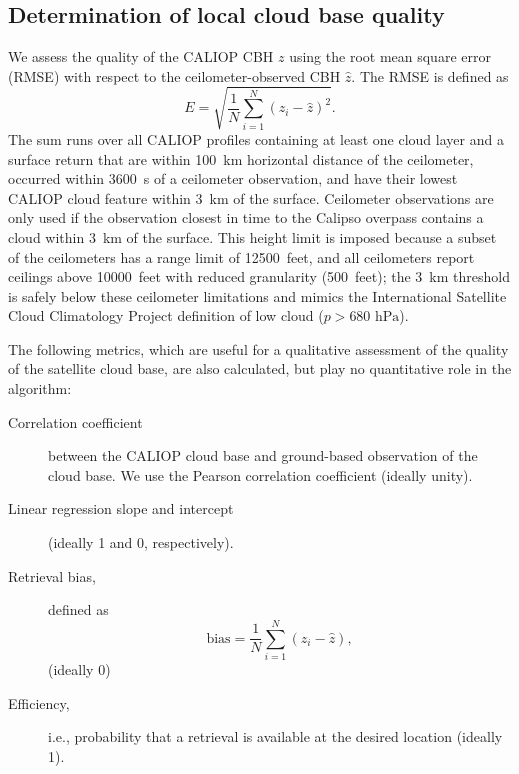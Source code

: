 \documentclass[essd,manuscript]{copernicus}\usepackage[]{graphicx}\usepackage[]{color}
\begin{document}
\subsection{Determination of local cloud base quality}
\label{sec:algorithm:qual}
We assess the quality of the CALIOP CBH $z$ using the root mean square error
(RMSE) with respect to the
ceilometer-observed CBH $\hat{z}$.  The RMSE is defined as
\begin{equation}
  \label{eq:rmse}
  E = \sqrt{\frac{1}{N}\sum\limits_{i = 1}^{N}\left(z_i - \hat{z}\right)^2}.
\end{equation}
The sum runs over all CALIOP profiles containing at least one cloud layer and a
surface return that are within 100~km horizontal distance of the ceilometer,
occurred within 3600~s of a ceilometer observation, and have their lowest CALIOP
cloud feature within 3~km of the surface.  Ceilometer observations are only used
if the observation closest in time to the Calipso overpass contains a cloud
within 3~km of the surface.  This height limit is imposed because a subset of
the ceilometers has a range limit of 12500~feet, and all ceilometers report
ceilings above 10000~feet with reduced granularity (500~feet); the 3~km
threshold is safely below these ceilometer limitations and mimics the
International Satellite Cloud Climatology Project \citep[ISCCP][]{Rossow1999}
definition of low cloud ($p > 680\text{ hPa}$).

The following metrics, which are useful for a qualitative assessment of the
quality of the satellite cloud base, are also calculated, but play no
quantitative role in the algorithm:
\begin{description}
\item[Correlation coefficient] between the CALIOP cloud base and ground-based
  observation of the cloud base.  We use the Pearson correlation coefficient
  (ideally unity).  
\item[Linear regression slope and intercept] (ideally 1 and 0, respectively).  
\item[Retrieval bias,] defined as
  \begin{equation}
    \label{eq:bias}
    \mbox{bias} = \frac{1}{N}\sum\limits_{i = 1}^{N}\left(z_i - \hat{z}\right),
  \end{equation}(ideally 0)
\item[Efficiency,] i.e., probability that a retrieval is available at the
  desired location (ideally 1).
\end{description}
\end{document}
